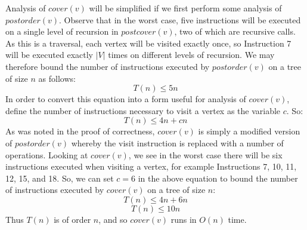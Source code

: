 \documentclass{article}
\begin{document}
Analysis of $cover(v)$ will be simplified if we first perform some analysis of
$postorder(v)$. Observe that in the worst case, five instructions will be
executed on a single level of recursion in $postcover(v)$, two of which are
recursive calls. As this is a traversal, each vertex will be visited exactly
once, so Instruction 7 will be executed exactly $|V|$ times on different levels
of recursion. We may therefore bound the number of instructions executed by
$postorder(v)$ on a tree of size $n$ as follows:
\begin{equation*}
T(n) \leq 5n
\end{equation*}
In order to convert this equation into a form useful for analysis of
$cover(v)$, define the number of instructions necessary to visit a vertex as
the variable $c$. So:
\begin{equation*}
T(n) \leq 4n + cn
\end{equation*}
As was noted in the proof of correctness, $cover(v)$ is simply a modified
version of $postorder(v)$ whereby the visit instruction is replaced with a
number of operations. Looking at $cover(v)$, we see in the worst case there will
be six instructions executed when visiting a vertex, for example Instructions
7, 10, 11, 12, 15, and 18. So, we can set $c=6$ in the above equation to bound
the number of instructions executed by $cover(v)$ on a tree of size $n$:
\begin{equation*}
T(n) \leq 4n + 6n
\end{equation*}
\begin{equation*}
T(n) \leq 10n
\end{equation*}
Thus $T(n)$ is of order $n$, and so $cover(v)$ runs in $O(n)$ time.
\end{document}
